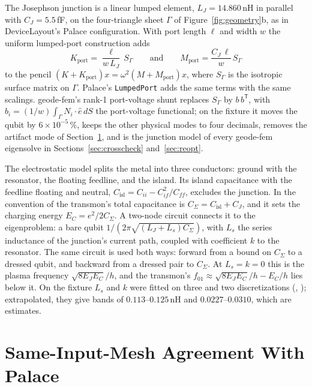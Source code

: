 \documentclass{anvil-paper}
\newcommand{\Cisl}{C_{\mathrm{isl}}}
\begin{document}
The Josephson junction is a linear lumped element, $L_J = 14.860$\,nH in
parallel with $C_J = 5.5$\,fF, on the four-triangle sheet $\Gamma$ of
Figure~\ref{fig:geometry}b, as in DeviceLayout's Palace configuration. With
port length $\ell$ and width $w$ the uniform lumped-port construction adds
\begin{equation}
  K_{\mathrm{port}} = \frac{\ell}{w\,L_J}\, S_\Gamma
  \qquad\text{and}\qquad
  M_{\mathrm{port}} = \frac{C_J\,\ell}{w}\, S_\Gamma
  \label{eq:port}
\end{equation}
to the pencil $(K + K_{\mathrm{port}})x = \omega^2(M + M_{\mathrm{port}})x$,
where $S_\Gamma$ is the isotropic surface matrix on $\Gamma$. Palace's
\texttt{LumpedPort} adds the same terms with the same scalings. geode-fem's
rank-1 port-voltage shunt replaces $S_\Gamma$ by $b\,b^{\mathsf T}$, with
$b_i = (1/w)\int_\Gamma N_i\cdot\hat e\,dS$ the port-voltage functional; on
the fixture it moves the qubit by $6\times10^{-5}\,\%$, keeps the other
physical modes to four decimals, removes the
artifact mode of Section~\ref{sec:agreement}, and is the junction model of
every geode-fem eigensolve in Sections~\ref{sec:crosscheck}
and~\ref{sec:reopt}.

The electrostatic model splits the metal into three conductors: ground
with the resonator, the floating feedline, and the island. Its island
capacitance with the feedline floating and neutral,
$\Cisl = C_{ii} - C_{if}^2/C_{ff}$, excludes the junction. In the
convention of \citet{koch2007charge} the transmon's total capacitance is
$C_\Sigma = \Cisl + C_J$, and it sets the charging energy $E_C =
e^2/2C_\Sigma$. A two-node circuit connects it to the eigenproblem: a bare
qubit $1/(2\pi\sqrt{(L_J + L_s)C_\Sigma})$, with $L_s$ the series
inductance of the junction's current path, coupled with coefficient $k$
to the resonator. The same circuit is used both ways: forward from a
bound on $C_\Sigma$ to a dressed qubit, and backward from a dressed pair to
$C_\Sigma$. At $L_s = k = 0$ this is the plasma frequency
$\sqrt{8E_JE_C}/h$, and the transmon's $f_{01} \approx \sqrt{8E_JE_C}/h -
E_C/h$ lies below it. On the fixture $L_s$ and $k$ were fitted on three and
two discretizations (,
); extrapolated, they give bands of $0.113$--$0.125$\,nH
and $0.0227$--$0.0310$, which are estimates.

\section{Same-Input-Mesh Agreement With Palace}
\label{sec:agreement}
\end{document}
